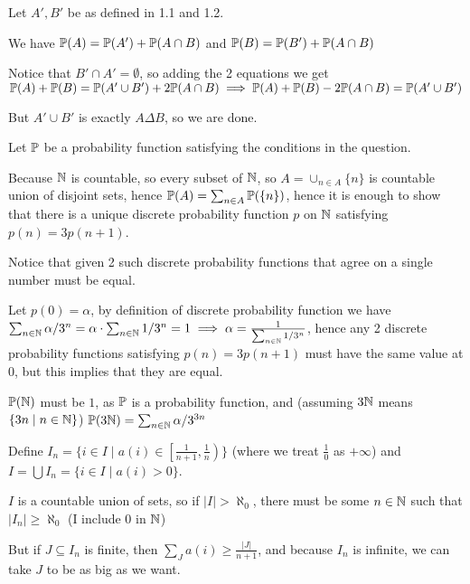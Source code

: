\begin{cExercise}
\begin{cPart}
	\end{cPart}
	\begin{cPart}
		Let $A',B'$ be as defined in 1.1 and 1.2.
		
		We have $\P(A)=\P(A')+\P(A\cap B)$ and $\P(B)=\P(B')+\P(A\cap B)$
		
		Notice that $B'\cap A'=\emptyset$, so adding the 2 equations we get $\P(A)+\P(B)=\P(A'\cup B')+2\P(A\cap B)\implies \P(A)+\P(B)-2\P(A\cap B)=\P(A'\cup B')$
		
		But $A'\cup B'$ is exactly $A\Delta B$, so we are done.
	\end{cPart}
\end{cExercise}
\begin{cExercise}
	Let $\P$ be a probability function satisfying the conditions in the question.
	
	Because $\N$ is countable, so every subset of $\N$, so $A=\cup_{n\in A}\{n\}$ is countable union of disjoint sets, hence $\P(A)=\sum_{n\in A}\P(\{n\})$, hence it is enough to show that there is a unique discrete probability function $p$ on $\N$ satisfying $p(n)=3p(n+1)$.
	
	Notice that given 2 such discrete probability functions that agree on a single number must be equal.
	
	Let $p(0)=\alpha$, by definition of discrete probability function we have $\sum_{n\in\N}\alpha/3^n=\alpha\cdot \sum_{n\in\N}1/3^n=1\implies \alpha=\frac1{\sum_{n\in\N}1/3^n}$, hence any 2 discrete probability functions satisfying $p(n)=3p(n+1)$ must have the same value at $0$, but this implies that they are equal.
	
	$\P(\N)$ must be $1$, as $\P$ is a probability function, and (assuming $3\N$ means $\{3n\mid n\in\N\}$) $\P(3\N)=\sum_{n\in\N}\alpha/3^{3n}$
\end{cExercise}
\begin{cExercise}
	Define $I_n=\{i\in I\mid a(i)\in \left[\frac1{n+1},\frac1{n}\right)\}$ (where we treat $\frac10$ as $+\infty$) and $I=\bigcup I_n=\{i\in I\mid a(i)>0\}$.
	
	$I$ is a countable union of sets, so if $|I|>\aleph_0$, there must be some $n\in\N$ such that $|I_n|\ge \aleph_0$ (I include $0$ in $\N$)
	
	But if $J\subseteq I_n$ is finite, then $\sum_J a(i)\ge \frac{|J|}{n+1}$, and because $I_n$ is infinite, we can take $J$ to be as big as we want.
\end{cExercise}
